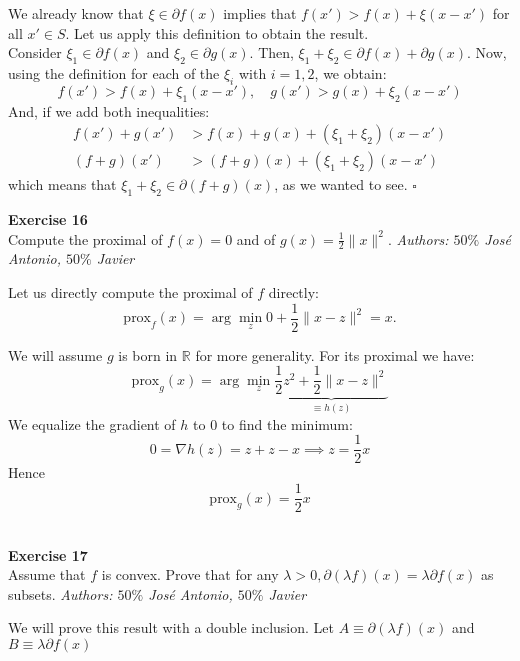 \documentclass[11pt,table]{article}
\newcommand{\qed}{\hfill $\square$}
\newenvironment{problem}[2][Exercise]
{ \begin{mdframed}[backgroundcolor=gray!20] \textbf{#1 #2} \\}
	{\hspace{0.0cm}\newline\newline \emph{Authors: \(50\%\) José Antonio, \(50\%\) Javier}  \end{mdframed}}
\newcommand\R{\mathbb R}
\begin{document}
We already know that \(\xi \in \partial f(x)\) implies that \(f(x') > f(x) + \xi(x-x')\) for all \(x' \in S\). Let us apply this definition to obtain the result.\\
Consider \(\xi_1 \in \partial f(x)\) and \(\xi_2 \in \partial g(x)\). Then, \(\xi_1 + \xi_2 \in \partial f(x) + \partial g(x)\). Now, using the definition for each of the \(\xi_i\) with \(i = 1,2\), we obtain:
\[
	f(x') > f(x) + \xi_1 (x-x'), \quad g(x') > g(x) + \xi_2(x-x')
\]
And, if we add both inequalities:
\begin{align*}
	f(x') + g(x')        & > f(x) + g(x) + (\xi_1 + \xi_2)(x-x')        \\
	\left(f+g\right)(x') & >\left(f+g\right)(x) + (\xi_1 + \xi_2)(x-x')
\end{align*}
which means that \(\xi_1 + \xi_2 \in \partial \left(f+g\right)(x) \), as we wanted to see. \qed \\

\begin{problem}{16}
Compute the proximal of \( f(x) = 0 \) and of \( g(x) = \frac{1}{2}\|x\|^2 \).
\end{problem}

Let us directly compute the proximal of $f$ directly:
\[
	\text{prox}_f(x) = \arg \min_z 0 + \frac{1}{2} \parallel x - z \parallel^2 = x.
\]

We will assume $g$ is born in $\R$ for more generality. For its proximal we have:
\[
	\text{prox}_g(x) = \arg \min_z \underbrace{\frac{1}{2}z^2 + \frac{1}{2} \parallel x - z \parallel^2}_{\equiv h(z)}
\]
We equalize the gradient of $h$ to $0$ to find the minimum:
\[
	0 = \nabla h(z) = z + z - x \implies z = \frac{1}{2}x
\]
Hence
\[
	\text{prox}_g(x) =  \frac{1}{2} x
\] \\

\begin{problem}{17}
Assume that \( f \)  is convex. Prove that for any \( \lambda > 0, \partial(\lambda f)(x) = \lambda \partial f(x) \) as subsets.
\end{problem}

We will prove this result with a double inclusion. Let $A \equiv \partial(\lambda f)(x)$ and $B \equiv \lambda \partial f(x)$
\end{document}
